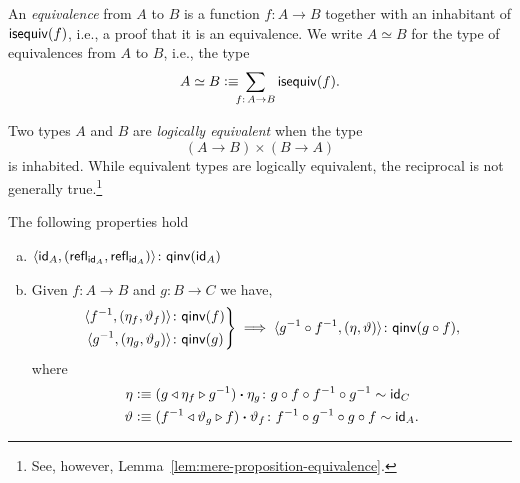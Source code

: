 \begin{defn}\label{defn:equivalence}
    An \textsl{equivalence} from $A$ to $B$ is a function $f\colon A\to B$ together with an inhabitant of $\mathsf{isequiv}(f)$, i.e., a proof that it is an equivalence. We write $A\simeq B$ for the type of equivalences from $A$ to $B$, i.e., the type
    \[
        A\simeq B\defeq\!\!\!\sum_{f\colon A\to B}\fun{isequiv}(f).
    \]
\end{defn}

\begin{rem}
    Two types $A$ and $B$ are \textsl{logically equivalent} when the type
    \[
        (A\to B)\times(B\to A)
    \]
    is inhabited. While equivalent types are logically equivalent, the reciprocal is not generally true.\footnote{See, however, Lemma~\ref{lem:mere-proposition-equivalence}.}
\end{rem}

\begin{prop}\label{prop:qinv-composition}
    The following properties hold
    \begin{enumerate}[a),font=\upshape]
        \item $\dep{\id_A,(\fun{refl}_{\id_A},\fun{refl}_{\id_A})}\colon\fun{qinv}(\id_A)$
        
        \item Given $f\colon A\to B$ and $g\colon B\to C$ we have,
        \[
            \left.\begin{aligned}
                \dep{f^{-1},(\eta_f,\vartheta_f)}
                    &\colon\fun{qinv}(f)\\
                \dep{g^{-1},(\eta_g,\vartheta_g)}
                    &\colon\fun{qinv}(g)
            \end{aligned}\right\}
            \implies\dep{g^{-1}\circ f^{-1},(\eta,\vartheta)}
                \colon\fun{qinv}(g\circ f),
        \]
        where
        \begin{align*}
            \eta&\defeq
                (g\lwct\eta_f\rwct g^{-1})\ct\eta_g
                    \colon g\circ f\circ f^{-1}\circ g^{-1}\sim\id_C\\
            \vartheta&\defeq
                (f^{-1}\lwct\vartheta_g\rwct f)\ct\vartheta_f
                    \colon f^{-1}\circ g^{-1}\circ g\circ f\sim\id_A.
        \end{align*}
    \end{enumerate}
\end{prop}

